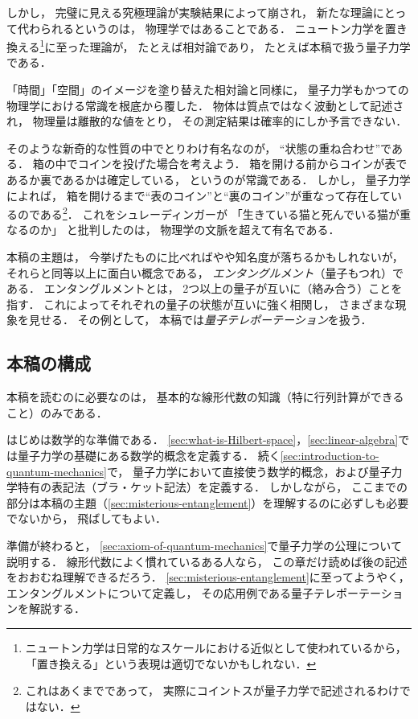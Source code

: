 \documentclass[
]{sotsu}
\begin{document}
しかし，
完璧に見える究極理論が実験結果によって崩され，
新たな理論にとって代わられるというのは，
物理学ではあることである．
ニュートン力学を置き換える\footnote{
    ニュートン力学は日常的なスケールにおける近似として使われているから，
    「置き換える」という表現は適切でないかもしれない．
}に至った理論が，
たとえば相対論であり，
たとえば本稿で扱う量子力学である．

「時間」「空間」のイメージを塗り替えた相対論と同様に，
量子力学もかつての物理学における常識を根底から覆した．
物体は質点ではなく波動として記述され，
物理量は離散的な値をとり，
その測定結果は確率的にしか予言できない．

そのような新奇的な性質の中でとりわけ有名なのが，
``状態の重ね合わせ''である．
箱の中でコインを投げた場合を考えよう．
箱を開ける前からコインが表であるか裏であるかは確定している，
というのが常識である．
しかし，
量子力学によれば，
箱を開けるまで``表のコイン''と``裏のコイン''が重なって存在しているのである\footnote{
    これはあくまでであって，
    実際にコイントスが量子力学で記述されるわけではない．
}．
これをシュレーディンガーが
「生きている猫と死んでいる猫が重なるのか」
と批判したのは，
物理学の文脈を超えて有名である．

本稿の主題は，
今挙げたものに比べればやや知名度が落ちるかもしれないが，
それらと同等以上に面白い概念である，
\emph{エンタングルメント}（量子もつれ）である．
エンタングルメントとは，
2つ以上の量子が互いに（絡み合う）ことを指す．
これによってそれぞれの量子の状態が互いに強く相関し，
さまざまな現象を見せる．
その例として，
本稿では\emph{量子テレポーテーション}を扱う．





\subsection{本稿の構成}

本稿を読むのに必要なのは，
基本的な線形代数の知識（特に行列計算ができること）のみである．

はじめは数学的な準備である．
\cref{sec:what-is-Hilbert-space}，\cref{sec:linear-algebra}では量子力学の基礎にある数学的概念を定義する．
続く\cref{sec:introduction-to-quantum-mechanics}で，
量子力学において直接使う数学的概念，および量子力学特有の表記法（ブラ・ケット記法）を定義する．
しかしながら，
ここまでの部分は本稿の主題（\cref{sec:misterious-entanglement}）を理解するのに必ずしも必要でないから，
飛ばしてもよい．

準備が終わると，
\cref{sec:axiom-of-quantum-mechanics}で量子力学の公理について説明する．
線形代数によく慣れているある人なら，
この章だけ読めば後の記述をおおむね理解できるだろう．
\cref{sec:misterious-entanglement}に至ってようやく，
エンタングルメントについて定義し，
その応用例である量子テレポーテーションを解説する．
\end{document}

